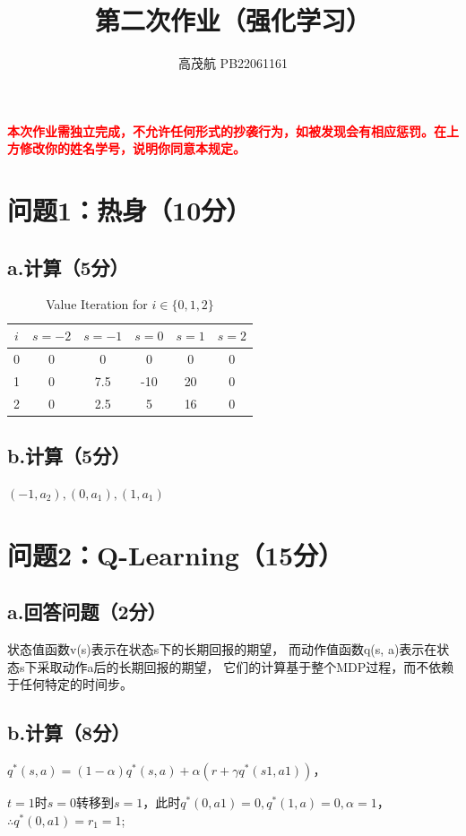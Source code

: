 \documentclass{article}
\title{\bfseries 第二次作业（强化学习）}
\author{高茂航  \quad  PB22061161}
\begin{document}
\maketitle
\textcolor{red}{\textbf{本次作业需独立完成，不允许任何形式的抄袭行为，如被发现会有相应惩罚。在上方修改你的姓名学号，说明你同意本规定。}}

\section*{问题1：热身（10分）}
\subsection*{a.计算（5分）}
    \begin{table}[h]
        \centering
        \begin{tabular}{|c|c|c|c|c|c|}
        \hline
        $i$ & $s=-2$ & $s=-1$ & $s=0$ & $s=1$ & $s=2$ \\
        \hline
        0 & 0 & 0 & 0 & 0 & 0 \\
        1 & 0&7.5 &-10 &20 & 0 \\
        2 & 0 & 2.5 & 5 & 16 & 0 \\
        \hline
        \end{tabular}
        \caption{Value Iteration for $i \in \{0, 1, 2\}$}
    \end{table}
\subsection*{b.计算（5分）}
$ (-1,a_2),(0,a_1),(1,a_1)$

\section*{问题2：Q-Learning（15分）}
\subsection*{a.回答问题（2分）}
状态值函数v(s)表示在状态s下的长期回报的期望，
而动作值函数q(s, a)表示在状态s下采取动作a后的长期回报的期望，
它们的计算基于整个MDP过程，而不依赖于任何特定的时间步。
\subsection*{b.计算（8分）}
$q^*(s, a) = (1-\alpha )q^*(s, a)+\alpha(r+\gamma q^*(s1, a1))$，

$t = 1$时$s=0$转移到$s=1$，此时$q^*(0, a1)=0,q^*(1, a)=0,\alpha=1$，$\therefore q^*(0, a1) = r_1=1$;
\end{document}
